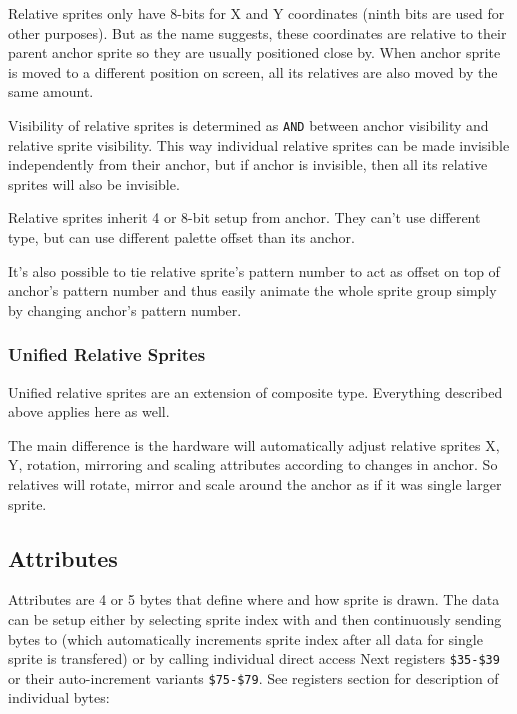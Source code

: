 \documentclass[12pt,twoside,openright,a4paper]{book}
\begin{document}
Relative sprites only have 8-bits for X and Y coordinates (ninth bits are used for other purposes). But as the name suggests, these coordinates are relative to their parent anchor sprite so they are usually positioned close by. When anchor sprite is moved to a different position on screen, all its relatives are also moved by the same amount.

Visibility of relative sprites is determined as {\tt AND} between anchor visibility and relative sprite visibility. This way individual relative sprites can be made invisible independently from their anchor, but if anchor is invisible, then all its relative sprites will also be invisible.

Relative sprites inherit 4 or 8-bit setup from anchor. They can't use different type, but can use different palette offset than its anchor.

It's also possible to tie relative sprite's pattern number to act as offset on top of anchor's pattern number and thus easily animate the whole sprite group simply by changing anchor's pattern number.

\subsubsection{Unified Relative Sprites}

Unified relative sprites are an extension of composite type. Everything described above applies here as well.

The main difference is the hardware will automatically adjust relative sprites X, Y, rotation, mirroring and scaling attributes according to changes in anchor. So relatives will rotate, mirror and scale around the anchor as if it was single larger sprite.

\subsection{Attributes}

Attributes are 4 or 5 bytes that define where and how sprite is drawn. The data can be setup either by selecting sprite index with  and then continuously sending bytes to  (which automatically increments sprite index after all data for single sprite is transfered) or by calling individual direct access Next registers {\tt \$35-\$39} or their auto-increment variants {\tt \$75-\$79}. See registers section for description of individual bytes:
\end{document}
